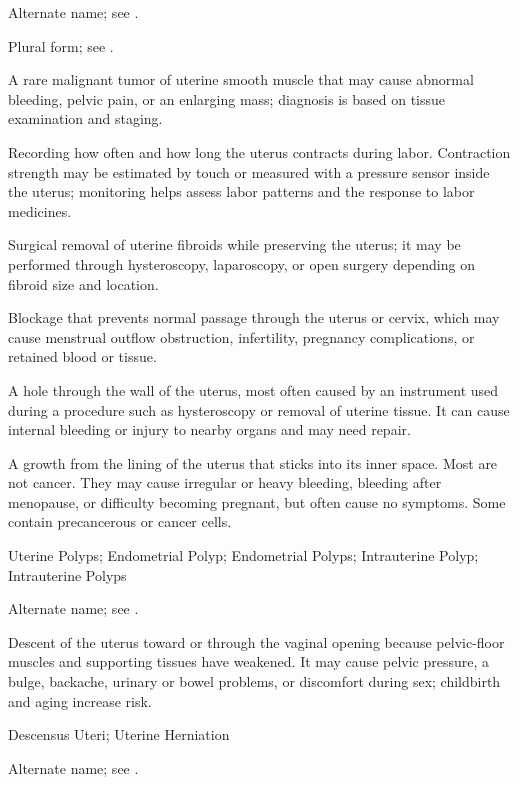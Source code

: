  Alternate name; see .

 Plural form; see .

 A rare malignant tumor of uterine smooth muscle that may cause abnormal bleeding, pelvic pain, or an enlarging mass; diagnosis is based on tissue examination and staging.

 Recording how often and how long the uterus contracts during labor. Contraction strength may be estimated by touch or measured with a pressure sensor inside the uterus; monitoring helps assess labor patterns and the response to labor medicines.

 Surgical removal of uterine fibroids while preserving the uterus; it may be performed through hysteroscopy, laparoscopy, or open surgery depending on fibroid size and location.

 Blockage that prevents normal passage through the uterus or cervix, which may cause menstrual outflow obstruction, infertility, pregnancy complications, or retained blood or tissue.

 A hole through the wall of the uterus, most often caused by an instrument used during a procedure such as hysteroscopy or removal of uterine tissue. It can cause internal bleeding or injury to nearby organs and may need repair.

 A growth from the lining of the uterus that sticks into its inner space. Most are not cancer. They may cause irregular or heavy bleeding, bleeding after menopause, or difficulty becoming pregnant, but often cause no symptoms. Some contain precancerous or cancer cells.

\synonyms
Uterine Polyps; Endometrial Polyp; Endometrial Polyps; Intrauterine Polyp; Intrauterine Polyps

 Alternate name; see .

 Descent of the uterus toward or through the vaginal opening because pelvic-floor muscles and supporting tissues have weakened. It may cause pelvic pressure, a bulge, backache, urinary or bowel problems, or discomfort during sex; childbirth and aging increase risk.

\synonyms
Descensus Uteri; Uterine Herniation

 Alternate name; see .

